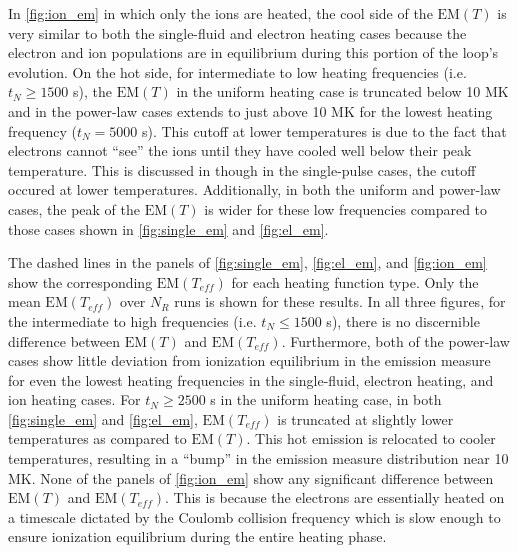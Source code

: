 \documentclass[apj]{emulateapj}
\begin{document}
	\par In \autoref{fig:ion_em} in which only the ions are heated, the cool side of the $\mathrm{EM}(T)$ is very similar to both the single-fluid and electron heating cases because the electron and ion populations are in equilibrium during this portion of the loop's evolution. On the hot side, for intermediate to low heating frequencies (i.e. $t_N\ge1500$ s), the $\mathrm{EM}(T)$ in the uniform heating case is truncated below 10 MK and in the power-law cases extends to just above 10 MK for the lowest heating frequency ($t_N=5000$ s). This cutoff at lower temperatures is due to the fact that electrons cannot ``see'' the ions until they have cooled well below their peak temperature. This is discussed in  though in the single-pulse cases, the cutoff occured at lower temperatures. Additionally, in both the uniform and power-law cases, the peak of the $\mathrm{EM}(T)$ is wider for these low frequencies compared to those cases shown in \autoref{fig:single_em} and \autoref{fig:el_em}.
	\par The dashed lines in the panels of \autoref{fig:single_em}, \autoref{fig:el_em}, and \autoref{fig:ion_em} show the corresponding $\mathrm{EM}(T_{eff})$ for each heating function type. Only the mean $\mathrm{EM}(T_{eff})$ over $N_R$ runs is shown for these results. In all three figures, for the intermediate to high frequencies (i.e. $t_N\le1500$ s), there is no discernible difference between $\mathrm{EM}(T)$ and $\mathrm{EM}(T_{eff})$. Furthermore, both of the power-law cases show little deviation from ionization equilibrium in the emission measure for even the lowest heating frequencies in the single-fluid, electron heating, and ion heating cases. For $t_N\ge2500$ s in the uniform heating case, in both \autoref{fig:single_em} and \autoref{fig:el_em}, $\mathrm{EM}(T_{eff})$ is truncated at slightly lower temperatures as compared to $\mathrm{EM}(T)$. This hot emission is relocated to cooler temperatures, resulting in a ``bump'' in the emission measure distribution near 10 MK. None of the panels of \autoref{fig:ion_em} show any significant difference between $\mathrm{EM}(T)$ and $\mathrm{EM}(T_{eff})$. This is because the electrons are essentially heated on a timescale dictated by the Coulomb collision frequency which is slow enough to ensure ionization equilibrium during the entire heating phase.
\end{document}
